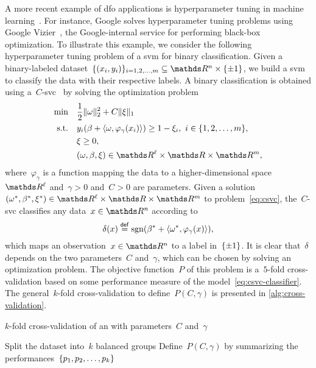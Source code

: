 A more recent example of \gls{dfo} applications is hyperparameter tuning in machine learning~\cite{Ghanbari_Scheinberg_2017}.
For instance, Google solves hyperparameter tuning problems using Google Vizier~\cite{Golovin_Etal_2017}, the Google-internal service for performing black-box optimization.
To illustrate this example, we consider the following hyperparameter tuning problem of a \gls{svm} for binary classification.
Given a binary-labeled dataset~$\set{(x_i, y_i)}_{i = 1, 2, \dots, m} \subseteq \R^n \times \set{\pm 1}$, we build a \gls{svm} to classify the data with their respective labels.
A binary classification is obtained using a~$C$-\gls{svc}~\cite{Chang_Lin_2011} by solving the optimization problem
\begin{subequations}
    \label{eq:csvc}
    \begin{align}
        \min        & \quad \frac{1}{2} \norm{\omega}_2^2 + C \norm{\xi}_1\\
        \text{s.t.} & \quad y_i (\beta + \inner{\omega, \varphi_{\gamma}(x_i)}) \ge 1 - \xi_i, ~ i \in \set{1, 2, \dots, m},\\
                    & \quad \xi \ge 0,\\
                    & \quad (\omega, \beta, \xi) \in \R^{\ell} \times \R \times \R^m,
    \end{align}
\end{subequations}
where~$\varphi_{\gamma}$ is a function mapping the data to a higher-dimensional space~$\R^{\ell}$ and~$\gamma > 0$ and~$C > 0$ are parameters.
Given a solution~$(\omega^{\ast}, \beta^{\ast}, \xi^{\ast}) \in \R^{\ell} \times \R \times \R^m$ to problem~\cref{eq:csvc}, the~$C$-\gls{svc} classifies any data~$x \in \R^n$ according to
\begin{equation}
    \label{eq:csvc-classifier}
    \delta(x) \mathrel{\stackrel{\mathsf{def}}{=}} \operatorname{sgn}(\beta^{\ast} + \langle\omega^{\ast}, \varphi_{\gamma}(x)\rangle),
\end{equation}
which maps an observation~$x \in \R^n$ to a label in~$\{\pm 1\}$.
It is clear that~$\delta$ depends on the two parameters~$C$ and~$\gamma$, which can be chosen by solving an optimization problem.
The objective function~$P$ of this problem is a~$5$-fold cross-validation based on some performance measure of the model~\cref{eq:csvc-classifier}.
The general~$k$-fold cross-validation to define~$P(C, \gamma)$ is presented in \cref{alg:cross-validation}.

\begin{algorithm}[ht]
    \caption{$k$-fold cross-validation of an  with parameters~$C$ and~$\gamma$}
    \label{alg:cross-validation}
    \DontPrintSemicolon
    Split the dataset into~$k$ balanced groups\;
    Define~$P(C, \gamma)$ by summarizing the performances~$\{p_1, p_2, \dots, p_k\}$\;
\end{algorithm}

